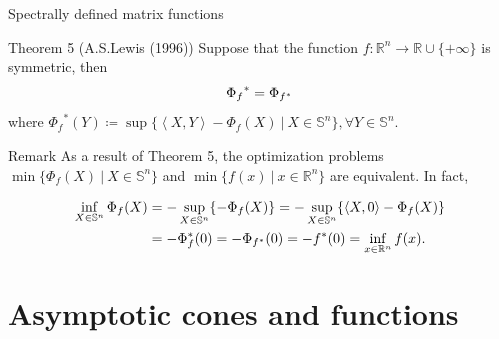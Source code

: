 \documentclass[aspectratio=169, dvipdfmx, 11pt]{beamer}
\newcommand{\RealNumberSet}{\mathbb{R}}
\newcommand{\NDemenstionalRealEuclideanSpace}{\mathbb{R}^n}
\newcommand{\NDemenstionalRealSymmetricMatrixSpace}{\mathbb{S}^n}
\newcommand{\InnerProduct}[2]{\left\langle {#1},{#2}\right\rangle} %
\newcommand{\ExtendedRealValuedFunction}[2]{{#1}: {#2} \to \RealNumberSet \cup \{+\infty\}}
\newcommand{\ConjugateFunction}[1]{{#1}^*}
\begin{document}
\begin{frame}{Spectrally defined matrix functions}
  \begin{block}{Theorem 5 (A.S.Lewis (1996))}
    Suppose that the function $\ExtendedRealValuedFunction{f}{\NDemenstionalRealEuclideanSpace}$ is symmetric, then
    \begin{equation}
      {\Phi_{f}}^* = \Phi_{f^*} \notag
    \end{equation}
    where ${\Phi_{f}}^* (Y) \coloneqq \sup \{\InnerProduct{X}{Y} - \Phi_{f} (X) \:|\: X \in \NDemenstionalRealSymmetricMatrixSpace\}, \forall Y \in \NDemenstionalRealSymmetricMatrixSpace$.
  \end{block}

  \begin{alertblock}{Remark}
    As a result of Theorem 5, the optimization problems $\min \{\Phi_{f}(X) \:|\: X \in \NDemenstionalRealSymmetricMatrixSpace\}$ and $\min \{f(x) \:|\: x \in \NDemenstionalRealEuclideanSpace\}$ are equivalent. In fact,

    \begin{align}
      \inf_{X \in \NDemenstionalRealSymmetricMatrixSpace} \Phi_{f}(X) &= - \sup_{X \in \NDemenstionalRealSymmetricMatrixSpace} \{- \Phi_{f}(X)\} = - \sup_{X \in \NDemenstionalRealSymmetricMatrixSpace} \{\InnerProduct{X}{0} - \Phi_{f}(X)\} \notag \\
      &= - \Phi^*_{f}(0) = - \Phi_{\ConjugateFunction{f}}(0) = - \ConjugateFunction{f}(0) = \inf_{x \in \NDemenstionalRealEuclideanSpace} f(x). \notag
    \end{align}
  \end{alertblock}
\end{frame}

\section{Asymptotic cones and functions}
\end{document}
